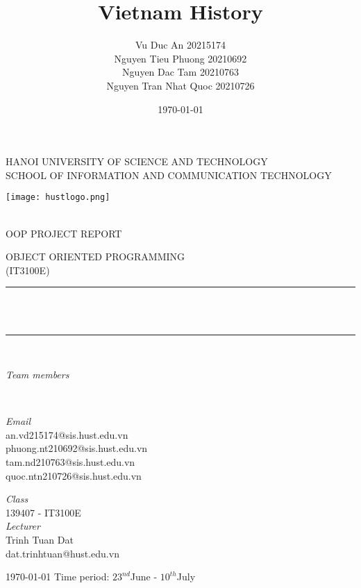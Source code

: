 \documentclass[a4paper,10pt,notitlepage]{article}
\title{Vietnam History}
\author{{Vu Duc An 20215174}
\\ {Nguyen Tieu Phuong 20210692}
\\ {Nguyen Dac Tam 20210763}
\\ {Nguyen Tran Nhat Quoc 20210726}}
\date{\today}
\makeatletter
\newcommand{\mails}{ {an.vd215174@sis.hust.edu.vn}
\\ {phuong.nt210692@sis.hust.edu.vn}
\\ {tam.nd210763@sis.hust.edu.vn}
\\ {quoc.ntn210726@sis.hust.edu.vn}}
\newcommand{\class}{139407 - IT3100E}
\newcommand{\lecturer}{{Trinh Tuan Dat}
\\dat.trinhtuan@hust.edu.vn
}
\makeatother
\begin{document}
 \raggedright
\NoBgThispage
\thispagestyle{empty}

	\newcommand{\HRule}{\rule{\linewidth}{0.3mm}} 
	\center 
	\MakeUppercase{\large Hanoi University of Science and Technology
	\\ \LARGE School of Information and Communication Technology}\\[0.5cm]
		{\texttt{[image: hustlogo.png]} \par}\\[0.5cm]
	\textsc	{\MakeUppercase{\Large OOP Project Report
}\\[0.75cm]}
	
	\textsc	{\MakeUppercase{\large Object oriented programming\\\normalsize (IT3100E)}\\[0.5cm]}
	
	\HRule\\[0.4cm]

	{\huge\bfseries \@title}\\[0.4cm]
	
	\HRule\\[1.5cm]
	\begin{minipage}{0.4\textwidth}
		\begin{flushleft}
			\large
			\textit{Team members}\\
			\@author
		\end{flushleft}
	\end{minipage}
	~
	\begin{minipage}{0.4\textwidth}
		\begin{flushright}
			\large
			\textit{Email}\\
			\mails 
		\end{flushright}
	\end{minipage}
\vfill\vfill
        \begin{minipage}{0.4\textwidth}
		\begin{center}
			\large
			\textit{Class}\\
			\class\\
			\textit{Lecturer}\\
			\lecturer\\
		\end{center}
	\end{minipage}
\vfill\vfill
		{\large\today} 
    \vfill\vfill
    \normalsize{Time period: $23^{nd}$June - $10^{th}$July}
    \\[0.3cm]
   
\end{document}
